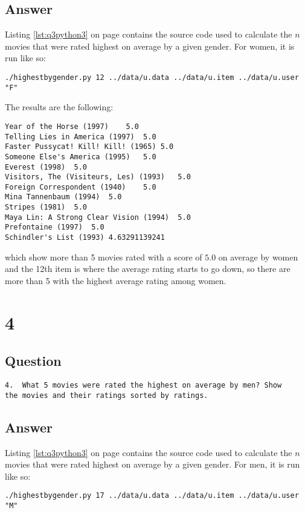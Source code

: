 \documentclass[letterpaper,11pt]{article}
\begin{document}
\subsection*{Answer}

Listing \ref{lst:q3python3} on page \pageref{lst:q3python3} contains the source code used to calculate the $n$ movies that were rated highest on average by a given gender.  For women, it is run like so:
\begin{lstlisting}[frame=single]
./highestbygender.py 12 ../data/u.data ../data/u.item ../data/u.user  "F"
\end{lstlisting}

The results are the following:
\begin{lstlisting}[frame=single]
Year of the Horse (1997)	5.0
Telling Lies in America (1997)	5.0
Faster Pussycat! Kill! Kill! (1965)	5.0
Someone Else's America (1995)	5.0
Everest (1998)	5.0
Visitors, The (Visiteurs, Les) (1993)	5.0
Foreign Correspondent (1940)	5.0
Mina Tannenbaum (1994)	5.0
Stripes (1981)	5.0
Maya Lin: A Strong Clear Vision (1994)	5.0
Prefontaine (1997)	5.0
Schindler's List (1993)	4.63291139241
\end{lstlisting}
which show more than 5 movies rated with a score of $5.0$  on average by women and the 12th item is where the average rating starts to go down, so there are more than 5 with the highest average rating among women.

\newpage

\section*{4}

\subsection*{Question}

\begin{verbatim}
4.  What 5 movies were rated the highest on average by men? Show
the movies and their ratings sorted by ratings.
\end{verbatim}

\subsection*{Answer}

Listing \ref{lst:q3python3} on page \pageref{let:q3python3} contains the source code used to calculate the $n$ movies that were rated highest on average by a given gender.  For men, it is run like so:
\begin{lstlisting}[frame=single]
./highestbygender.py 17 ../data/u.data ../data/u.item ../data/u.user  "M"
\end{lstlisting}
\end{document}
